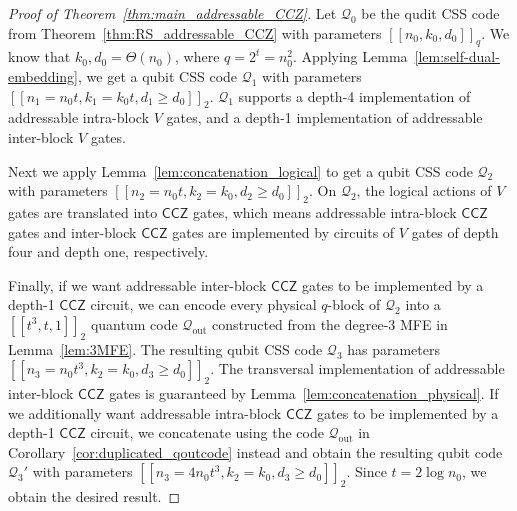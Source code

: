 \documentclass[11pt]{article}
\theoremstyle{definition}
\renewcommand{\ge}{\geqslant}
\newcommand{\CCZ}{\mathsf{CCZ}}
\newcommand{\qcode}{\mathcal{Q}}
\newcommand{\qoutcode}{\mathcal{Q}_{\text{out}}}
\begin{document}
\begin{proof}[Proof of Theorem~\ref{thm:main_addressable_CCZ}]
    Let $\qcode_0$ be the qudit CSS code from Theorem~\ref{thm:RS_addressable_CCZ} with parameters $[[n_0,k_0,d_0]]_q$.
    We know that $k_0,d_0 = \Theta(n_0)$, where $q=2^t = n_0^2$.
    Applying Lemma~\ref{lem:self-dual-embedding}, we get a qubit CSS code $\qcode_1$ with parameters $[[n_1 = n_0t, k_1 = k_0t, d_1\ge d_0]]_2$.
    $\qcode_1$ supports a depth-4 implementation of addressable intra-block $V$ gates, and a depth-1 implementation of addressable inter-block $V$ gates. 
        
    Next we apply Lemma~\ref{lem:concatenation_logical} to get a qubit CSS code $\qcode_2$ with parameters $[[n_2 = n_0t, k_2 = k_0, d_2\ge d_0]]_2$.
    On $\qcode_2$, the logical actions of $V$ gates are translated into $\CCZ$ gates, which means addressable intra-block $\CCZ$ gates and inter-block $\CCZ$ gates are implemented by circuits of $V$ gates of depth four and depth one, respectively. 
    
    Finally, if we want addressable inter-block $\CCZ$ gates to be implemented by a depth-1 $\CCZ$ circuit, we can encode every physical $q$-block of $\qcode_2$ into a $[[t^3,t,1]]_2$ quantum code $\qoutcode$ constructed from the degree-3 MFE in Lemma~\ref{lem:3MFE}.
    The resulting qubit CSS code $\qcode_3$ has parameters $[[n_3 = n_0t^3, k_2 = k_0, d_3\ge d_0]]_2$.
    The transversal implementation of addressable inter-block $\CCZ$ gates is guaranteed by Lemma~\ref{lem:concatenation_physical}.
    If we additionally want addressable intra-block $\CCZ$ gates to be implemented by a depth-1 $\CCZ$ circuit, we concatenate using the code $\qoutcode$ in Corollary~\ref{cor:duplicated_qoutcode} instead and obtain the resulting qubit code $\qcode_3'$ with parameters $[[n_3 = 4n_0t^3, k_2 = k_0, d_3\ge d_0]]_2$. Since $t = 2\log n_0$, we obtain the desired result.
\end{proof}
\end{document}
